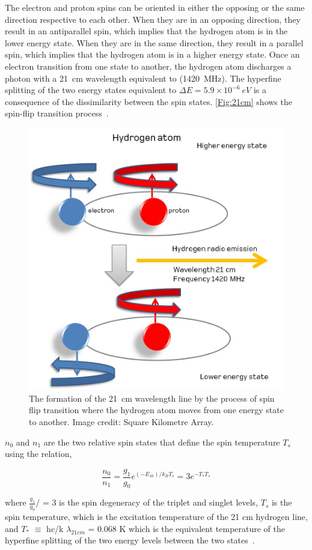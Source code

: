 	The electron and proton spins can be oriented in either the opposing or the same direction respective to each other. When they are in an opposing direction, they result in an antiparallel spin, which implies that the hydrogen atom is in the lower energy state. When they are in the same direction, they result in a parallel spin, which implies that the hydrogen atom is in a higher energy state. Once an electron transition from one state to another, the hydrogen atom discharges a photon with a \SI{21}{cm} wavelength equivalent to (\SI{1420}{MHz}). The hyperfine splitting of the two energy states equivalent to \(\Delta E =  5.9 \times 10^{-6} \ eV\) is a consequence of the dissimilarity between the spin states. \autoref{Fig:21cm} shows the spin-flip transition process~\citep{16, book:832129}.
	
	\begin{figure}
		\begin{center}
			\includegraphics[width=0.5\linewidth]{Figures/Hydrogenemission1.jpeg}
			\caption{The formation of the \SI{21}{cm} wavelength line by the process of spin flip transition where the hydrogen atom moves from one energy state to another. Image credit: {Square Kilometre Array}.}
			\label{Fig:21cm}
		\end{center}
	\end{figure}
	
	$n_0$ and $n_1$ are the two relative spin states that define the spin temperature $T_s$ using the relation,
	
	\begin{equation}
	\frac{n_0}{n_1} = \frac{g_1}{g_0}e^{(-E_10)/{k_B}{T_s}} = 3e^{{-T_*}{T_s}}
	\end{equation}
	
	where $\frac{g_1}{g_0}/$ = 3 is the spin degeneracy of the triplet and singlet levels, $T_s$ is the spin temperature, which is the excitation temperature of the 21 cm hydrogen line, and $T_{*}$ $\equiv$ hc/k $\lambda_{21cm}$ = 0.068 K which is the equivalent temperature of the hyperfine splitting of the two energy levels between the two states~\citep{2012RPPh...75h6901P}.
	

